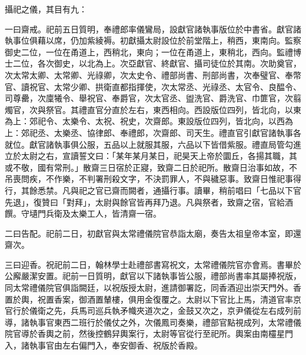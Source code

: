 \begin{pinyinscope}
 攝祀之儀，其目有九：



 一曰齋戒。祀前五日質明，奉禮郎率儀鸞局，設獻官諸執事版位於中書省。獻官諸執事位俱藉以席，仍加紫綾褥。初獻攝太尉設位於前堂階上，稍西，東南向。監察御史二位，一位在甬道上，西稍北，東向；一位在甬道上，東稍北，西向。監禮博士二位，各次御史，以北為上。次亞獻官、終獻官、攝司徒位於其南。次助奠官，次太常太卿、太常卿、光祿卿，次太史令、禮部尚書、刑部尚書，次奉璧官、奉幣官、讀祝官、太常少卿、拱衛直都指揮使，次太常丞、光祿丞、太官令、良醖令、司尊罍，次廩犧令、舉祝官、奉爵官，次太官丞、盥洗官、爵洗官、巾篚官，次翦燭官，次與祭官。其禮直官分直於左右，東西相向。西設版位四列，皆北向，以東為上：郊祀令、太樂令、太祝、祝史，次齋郎。東設版位四列，皆北向，以西為上：郊祀丞、太樂丞、協律郎、奉禮郎，次齋郎、司天生。禮直官引獻官諸執事各就位。獻官諸執事俱公服，五品以上就服其服，六品以下皆借紫服。禮直局管勾進立於太尉之右，宣讀誓文曰：「某年某月某日，祀昊天上帝於圜丘，各揚其職，其或不敬，國有常刑。」散齋三日宿於正寢，致齋二日於祀所。散齋日治事如故，不吊喪問疾，不作樂，不判署刑殺文字，不決罰罪人，不與穢惡事。致齋日惟祀事得行，其餘悉禁。凡與祀之官已齋而闕者，通攝行事。讀畢，稍前唱曰「七品以下官先退」，復贊曰「對拜」，太尉與餘官皆再拜乃退。凡與祭者，致齋之宿，官給酒饌。守壝門兵衛及太樂工人，皆清齋一宿。



 二曰告配。祀前二日，初獻官與太常禮儀院官恭詣太廟，奏告太祖皇帝本室，即還齋次。



 三曰迎香。祝祀前二日，翰林學士赴禮部書寫祝文，太常禮儀院官亦會焉。書畢於公廨嚴潔安置。祀前一日質明，獻官以下諸執事皆公服，禮部尚書率其屬捧祝版，同太常禮儀院官俱詣闕廷，以祝版授太尉，進請御署訖，同香酒迎出崇天門外。香置於輿，祝置香案，御酒置輦樓，俱用金復覆之。太尉以下官比上馬，清道官率京官行於儀衛之先，兵馬司巡兵執矛幟夾道次之，金鼓又次之，京尹儀從左右成列前導，諸執事官東西二班行於儀仗之外，次儀鳳司奏樂，禮部官點視成列，太常禮儀院官導於香輿之前，然後控鶴舁輿案行，太尉等官從行至祀所。輿案由南欞星門入，諸執事官由左右偏門入，奉安御香、祝版於香殿。




\end{pinyinscope}
